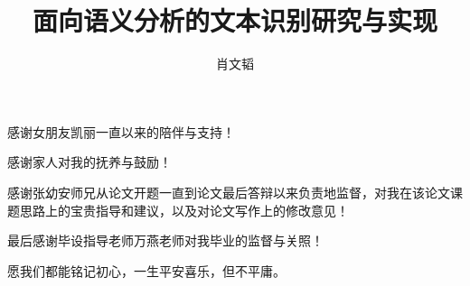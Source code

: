 \documentclass[project, fontset=windows, openany, oneside, submit]{sjtuthesis}
\begin{document}
\title{面向语义分析的文本识别研究与实现}
\author{肖文韬}


\pagestyle{main}
\setcounter{page}{1}

\tableofcontents

\begin{finish}


\backmatter %
\printbibliography[heading=bibintoc]

\begin{thanks}

感谢女朋友凯丽一直以来的陪伴与支持！

感谢家人对我的抚养与鼓励！

感谢张幼安师兄从论文开题一直到论文最后答辩以来负责地监督，对我在该论文课题思路上的宝贵指导和建议，以及对论文写作上的修改意见！

最后感谢毕设指导老师万燕老师对我毕业的监督与关照！

愿我们都能铭记初心，一生平安喜乐，但不平庸。

\end{thanks}

\end{finish}
\end{document}
